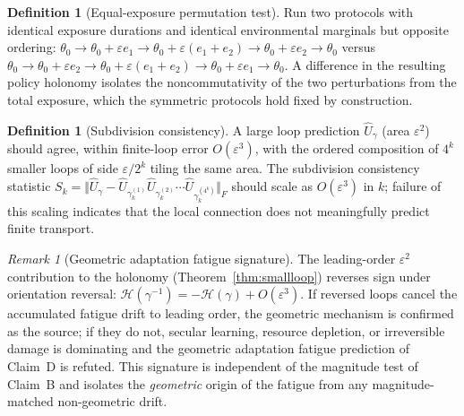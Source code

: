 \documentclass[11pt,a4paper]{article}
\theoremstyle{plain}
\theoremstyle{definition}
\newtheorem{definition}[theorem]{Definition}
\theoremstyle{remark}
\newtheorem{remark}[theorem]{Remark}
\newcommand{\normF}[1]{\mathopen{}\Vert#1\mathclose{}\Vert_{\!F}}
\begin{document}
\begin{definition}[Equal-exposure permutation test]
\label{def:permutation}
Run two protocols with identical exposure durations and identical
environmental marginals but opposite ordering:
$\theta_0 \to \theta_0 + \varepsilon e_1 \to \theta_0 +
\varepsilon(e_1 + e_2) \to \theta_0 + \varepsilon e_2 \to \theta_0$
versus $\theta_0 \to \theta_0 + \varepsilon e_2 \to \theta_0 +
\varepsilon(e_1 + e_2) \to \theta_0 + \varepsilon e_1 \to \theta_0$.
A difference in the resulting policy holonomy isolates the
noncommutativity of the two perturbations from the total exposure,
which the symmetric protocols hold fixed by construction.
\end{definition}

\begin{definition}[Subdivision consistency]
\label{def:subdivision}
A large loop prediction $\widehat{U}_\gamma$ (area $\varepsilon^2$)
should agree, within finite-loop error $O(\varepsilon^3)$, with the
ordered composition of $4^k$ smaller loops of side $\varepsilon/2^k$
tiling the same area. The subdivision consistency statistic
$S_k = \normF{\widehat{U}_\gamma - \widehat{U}_{\gamma_k^{(1)}}
\widehat{U}_{\gamma_k^{(2)}} \cdots \widehat{U}_{\gamma_k^{(4^k)}}}$
should scale as $O(\varepsilon^3)$ in $k$; failure of this scaling
indicates that the local connection does not meaningfully predict
finite transport.
\end{definition}

\begin{remark}[Geometric adaptation fatigue signature]
\label{rem:reversed-loop}
The leading-order $\varepsilon^2$ contribution to the holonomy
(Theorem~\ref{thm:smallloop}) reverses sign under orientation
reversal: $\mathcal{H}(\gamma^{-1}) = -\mathcal{H}(\gamma) +
O(\varepsilon^3)$. If reversed loops cancel the accumulated fatigue
drift to leading order, the geometric mechanism is confirmed as the
source; if they do not, secular learning, resource depletion, or
irreversible damage is dominating and the geometric adaptation
fatigue prediction of Claim~D is refuted. This signature is
independent of the magnitude test of Claim~B and isolates the
\emph{geometric} origin of the fatigue from any magnitude-matched
non-geometric drift.
\end{remark}
\end{document}
